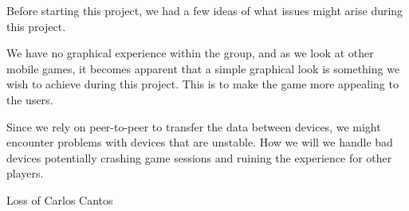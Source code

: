 Before starting this project, we had a few ideas of what issues might arise during this project.

We have no graphical experience within the group, and as we look at other mobile games, it becomes apparent that a simple graphical look is something we wish to achieve during this project. This is to make the game more appealing to the users.

Since we rely on peer-to-peer to transfer the data between devices, we might encounter problems with devices that are unstable. How we will we handle bad devices potentially crashing game sessions and ruining the experience for other players.

Loss of Carlos Cantos 
